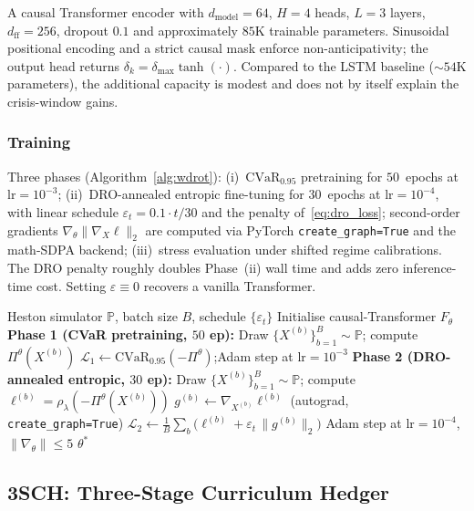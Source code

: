 \documentclass[10pt,letterpaper]{article}
\newcommand{\cvar}{\mathrm{CVaR}}
\newcommand{\PP}{\mathbb{P}}
\let\STATE\State
\let\REQUIRE\Require
\let\RETURN\Return
\begin{document}
A causal Transformer encoder with $d_{\mathrm{model}}=64$, $H=4$
heads, $L=3$ layers, $d_{\mathrm{ff}}=256$, dropout $0.1$ and
approximately $85$K trainable parameters. Sinusoidal positional
encoding and a strict causal mask enforce non-anticipativity; the
output head returns $\delta_k=\delta_{\max}\tanh(\cdot)$. Compared to
the LSTM baseline ($\sim 54$K parameters), the additional capacity
is modest and does not by itself explain the crisis-window gains.

\subsubsection*{Training}

Three phases (Algorithm~\ref{alg:wdrot}):
(i)~$\cvar_{0.95}$ pretraining for $50$~epochs at
$\mathrm{lr}=10^{-3}$;
(ii)~DRO-annealed entropic fine-tuning for $30$~epochs at
$\mathrm{lr}=10^{-4}$, with linear schedule
$\varepsilon_t=0.1\cdot t/30$ and the penalty
of~\eqref{eq:dro_loss}; second-order gradients
$\nabla_\theta\|\nabla_X\ell\|_2$ are computed via PyTorch
\texttt{create\_graph=True} and the math-SDPA backend;
(iii)~stress evaluation under shifted regime calibrations. The DRO
penalty roughly doubles Phase~(ii) wall time and adds zero
inference-time cost. Setting $\varepsilon\!\equiv\!0$ recovers a
vanilla Transformer.

\begin{algorithm}[ht]
\caption{W-DRO-T training}\label{alg:wdrot}
\begin{algorithmic}[1]
\REQUIRE Heston simulator $\PP$, batch size $B$, schedule $\{\varepsilon_t\}$
\STATE Initialise causal-Transformer $F_\theta$
\STATE \textbf{Phase 1 (CVaR pretraining, $50$ ep):}
  \STATE Draw $\{X^{(b)}\}_{b=1}^B\sim\PP$; compute $\Pi^\theta(X^{(b)})$
  \STATE $\mathcal{L}_1\gets \cvar_{0.95}(-\Pi^\theta)$;\quad Adam step at $\mathrm{lr}=10^{-3}$
\ENDFOR
\STATE \textbf{Phase 2 (DRO-annealed entropic, $30$ ep):}
  \STATE Draw $\{X^{(b)}\}_{b=1}^B\sim\PP$; compute $\ell^{(b)}=\rho_\lambda(-\Pi^\theta(X^{(b)}))$
  \STATE $g^{(b)}\gets \nabla_{X^{(b)}}\ell^{(b)}$ \hfill (autograd, \texttt{create\_graph=True})
  \STATE $\mathcal{L}_2\gets \tfrac{1}{B}\sum_b\bigl(\ell^{(b)}+\varepsilon_t\,\|g^{(b)}\|_2\bigr)$
  \STATE Adam step at $\mathrm{lr}=10^{-4}$, $\|\nabla_\theta\|\le 5$
\ENDFOR
\STATE \RETURN $\theta^*$
\end{algorithmic}
\end{algorithm}

\subsection{3SCH: Three-Stage Curriculum Hedger}\label{sec:3sch}
\end{document}
